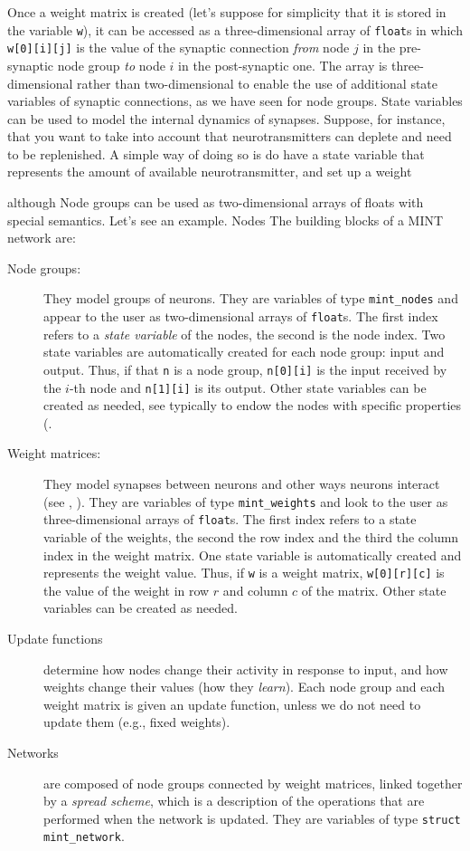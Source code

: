 \documentclass[12pt,letterpaper]{memoir}
\newcommand{\ls}[1]{\lstinline{#1}}
\let\fref\relax%
\newcommand{\mint}{MINT\xspace}
\begin{document}
Once a weight matrix is created (let's suppose for simplicity that it
is stored in the variable \ls{w}), it can be accessed as a
three-dimensional array of \ls{float}s in which \ls{w[0][i][j]} is the
value of the synaptic connection \textit{from} node $j$ in the
pre-synaptic node group \textit{to} node $i$ in the post-synaptic
one. The array is three-dimensional rather than two-dimensional to
enable the use of additional state variables of synaptic connections,
as we have seen for node groups. State variables can be used to model
the internal dynamics of synapses. Suppose, for instance, that you
want to take into account that neurotransmitters can deplete and need
to be replenished. A simple way of doing so is do have a state
variable that represents the amount of available neurotransmitter, and
set up a weight

although Node groups can be used as
two-dimensional arrays of floats with special semantics. Let's see an
example. Nodes The building blocks of a \mint network are:
\begin{description}
\item[Node groups:] They model groups of neurons. They are variables
  of type \lstinline{mint_nodes} and appear to the user as
  two-dimensional arrays of \lstinline{float}s. The first index refers
  to a \textit{state variable} of the nodes, the second is the node
  index. Two state variables are automatically created for each node
  group: input and output. Thus, if that \lstinline{n} is a node
  group, \lstinline{n[0][i]} is the input received by the $i$-th node
  and \lstinline{n[1][i]} is its output. Other state variables can be
  created as needed, see typically to endow the nodes with specific
  properties (\fref{sec:transfer-functions}.
\item[Weight matrices:] They model synapses between neurons and other
  ways neurons interact (see \fref{sec:hormones-etc},
  \fref{sec:body-states}). They are variables of type
  \lstinline{mint_weights} and look to the user as three-dimensional
  arrays of \lstinline{float}s. The first index refers to a state
  variable of the weights, the second the row index and the third the
  column index in the weight matrix. One state variable is
  automatically created and represents the weight value. Thus, if
  \lstinline{w} is a weight matrix, \lstinline{w[0][r][c]} is the
  value of the weight in row $r$ and column $c$ of the matrix. Other
  state variables can be created as needed.
\item[Update functions] determine how nodes change their activity in
  response to input, and how weights change their values (how they
  \textit{learn}). Each node group and each weight matrix is given an
  update function, unless we do not need to update them (e.g., fixed
  weights).
\item[Networks] are composed of node groups connected by weight
  matrices, linked together by a \textit{spread scheme}, which is a
  description of the operations that are performed when the network is
  updated. They are variables of type \lstinline{struct mint_network}.
\end{description}
\end{document}
